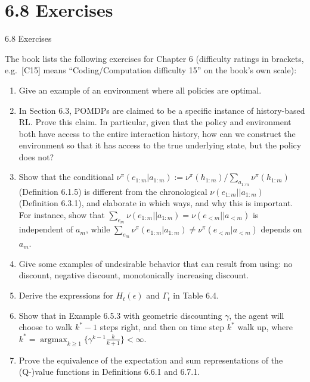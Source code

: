 \documentclass[aspectratio=169,10pt]{beamer}
\begin{document}
\section{6.8 Exercises}

\begin{frame}[allowframebreaks]{6.8 Exercises}

The book lists the following exercises for Chapter 6 (difficulty ratings in
brackets, e.g.\ [C15] means ``Coding/Computation difficulty 15'' on the
book's own scale):

\begin{enumerate}
  \item [C03] Give an example of an environment where all policies are
    optimal.
  \item [C15] In Section 6.3, POMDPs are claimed to be a specific instance
    of history-based RL. Prove this claim. In particular, given that the
    policy and environment both have access to the entire interaction
    history, how can we construct the environment so that it has access to
    the true underlying state, but the policy does not?
  \item [C20] Show that the conditional
    $\nu^\pi(e_{1:m}|a_{1:m}) := \nu^\pi(h_{1:m})/\sum_{a_{1:m}}\nu^\pi(h_{1:m})$
    (Definition 6.1.5) is different from the chronological
    $\nu(e_{1:m}||a_{1:m})$ (Definition 6.3.1), and elaborate in which ways,
    and why this is important. For instance, show that
    $\sum_{e_m}\nu(e_{1:m}||a_{1:m}) = \nu(e_{<m}||a_{<m})$ is independent
    of $a_m$, while $\sum_{e_m}\nu^\pi(e_{1:m}|a_{1:m}) \ne
    \nu^\pi(e_{<m}|a_{<m})$ depends on $a_m$.
  \item [C10] Give some examples of undesirable behavior that can result
    from using: no discount, negative discount, monotonically increasing
    discount.
  \item [C20] Derive the expressions for $H_t(\epsilon)$ and $\Gamma_t$ in
    Table 6.4.
  \item [C10] Show that in Example 6.5.3 with geometric discounting
    $\gamma$, the agent will choose to walk $k^{*}-1$ steps right, and then
    on time step $k^{*}$ walk up, where
    $k^{*}=\operatorname{argmax}_{k\ge1}\{\gamma^{k-1}\tfrac{k}{k+1}\}<\infty$.
  \item [C15] Prove the equivalence of the expectation and sum
    representations of the (Q-)value functions in Definitions 6.6.1 and
    6.7.1.


\end{enumerate}
\end{frame}
\end{document}
